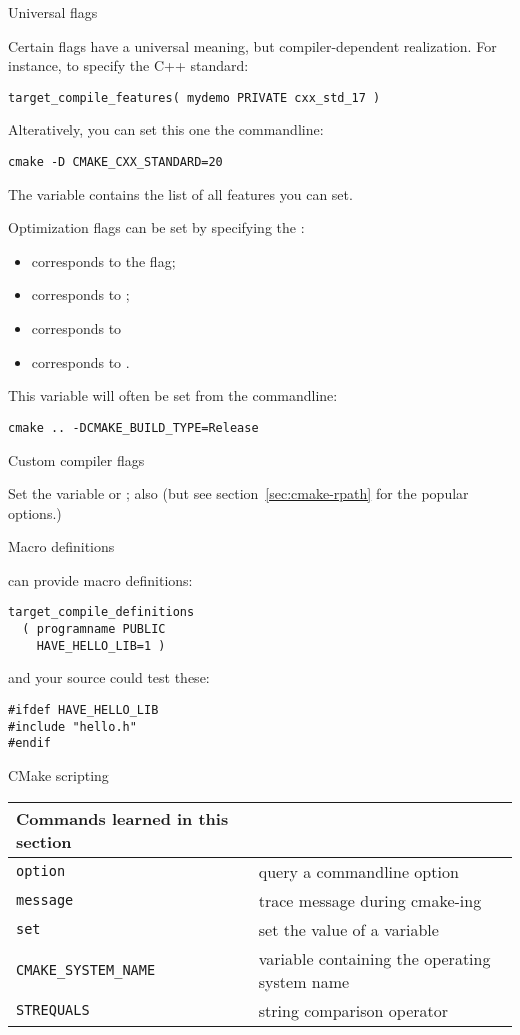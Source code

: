  {Universal flags}

Certain flags have a universal meaning, but compiler-dependent realization.
For instance, to specify the C++ standard:
\begin{lstlisting}
target_compile_features( mydemo PRIVATE cxx_std_17 )
\end{lstlisting}
Alteratively, you can set this one the commandline:
\begingroup\lstset{language=Bash}
\begin{lstlisting}
cmake -D CMAKE_CXX_STANDARD=20
\end{lstlisting}
\endgroup
The variable 
contains the list of all features you can set.

Optimization flags can be set by specifying the :
\begin{itemize}
\item 
     corresponds to the  flag;
\item
     corresponds to ;
\item
     corresponds to 
\item 
     corresponds to .
\end{itemize}
This variable will often be set from the commandline:
\begin{verbatim}
cmake .. -DCMAKE_BUILD_TYPE=Release
\end{verbatim}

 {Custom compiler flags}

Set the variable
or
;
also
(but see section~\ref{sec:cmake-rpath}
for the popular  options.)

 {Macro definitions}

 can provide macro definitions:
\begin{lstlisting}
target_compile_definitions
  ( programname PUBLIC
    HAVE_HELLO_LIB=1 )
\end{lstlisting}
and your source could test these:
\lstset{language=C}
\begin{lstlisting}
#ifdef HAVE_HELLO_LIB
#include "hello.h"
#endif
\end{lstlisting}
\lstset{language=CMake}

 {CMake scripting}
\label{sec:cmake-script}

\begin{tabular}{lp{3in}}
  \toprule
  Commands learned in this section\\
  \midrule
  \lstinline+option+&query a commandline option\\
  \lstinline+message+&trace message during cmake-ing\\
  \lstinline+set+&set the value of a variable\\
  \lstinline+CMAKE_SYSTEM_NAME+&variable containing the operating system name\\
  \lstinline+STREQUALS+&string comparison operator\\
  \bottomrule
\end{tabular}

